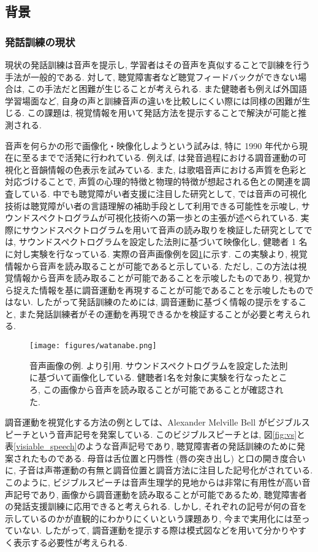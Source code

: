 \subsection{背景}
\subsubsection{発話訓練の現状}
現状の発話訓練は音声を提示し, 学習者はその音声を真似することで訓練を行う手法が一般的である. 対して, 聴覚障害者など聴覚フィードバックができない場合は, この手法だと困難が生じることが考えられる. また健聴者も例えば外国語学習場面など, 自身の声と訓練音声の違いを比較しにくい際には同様の困難が生じる.
この課題は, 視覚情報を用いて発話方法を提示することで解決が可能と推測される.

音声を何らかの形で画像化・映像化しようという試みは, 特に 1990 年代から現在に至るまでで活発に行われている. 例えば, \cite{sirai_kobayashi}は発音過程における調音運動の可視化と音韻情報の色表示を試みている. また, \cite{kanato_kikuchi}は歌唱音声における声質を色彩と対応づけることで, 声質の心理的特徴と物理的特徴が想起される色との関連を調査している.
中でも聴覚障がい者支援に注目した研究として, \cite{kasuya}では音声の可視化技術は聴覚障がい者の言語理解の補助手段として利用できる可能性を示唆し, サウンドスペクトログラムが可視化技術への第一歩との主張が述べられている.
実際にサウンドスペクトログラムを用いて音声の読み取りを検証した研究として\cite{watanabe}では, サウンドスペクトログラムを設定した法則に基づいて映像化し, 健聴者 1 名に対し実験を行なっている. 実際の音声画像例を図\ref{watanabe:fig}に示す. この実験より, 視覚情報から音声を読み取ることが可能であると示している. ただし, この方法は視覚情報から音声を読み取ることが可能であることを示唆したものであり, 視覚から捉えた情報を基に調音運動を再現することが可能であることを示唆したものではない.
したがって発話訓練のためには, 調音運動に基づく情報の提示をすること, また発話訓練者がその運動を再現できるかを検証することが必要と考えられる.

\begin{figure}[hbtp]
 \centering
   \texttt{[image: figures/watanabe.png]}
 \caption[音声画像の例]{音声画像の例. \cite{watanabe}より引用. サウンドスペクトログラムを設定した法則に基づいて画像化している. 健聴者1名を対象に実験を行なったところ, この画像から音声を読み取ることが可能であることが確認された. }
 \label{watanabe:fig}
\end{figure}

\newpage
調音運動を視覚化する方法の例としては、Alexander Melville Bell がビジブルスピーチという音声記号を発案している\cite{igarashi}. このビジブルスピーチとは, 図\ref{fig:vs}と表\ref{visiable_speech}のような音声記号であり, 聴覚障害者の発話訓練のために発案されたものである\cite{hattori}. 母音は舌位置と円唇性 (唇の突き出し) と口の開き度合いに, 子音は声帯運動の有無と調音位置と調音方法に注目した記号化がされている.
このように, ビジブルスピーチは音声生理学的見地からは非常に有用性が高い音声記号であり, 画像から調音運動を読み取ることが可能であるため, 聴覚障害者の発話支援訓練に応用できると考えられる. しかし, それぞれの記号が何の音を示しているのかが直観的にわかりにくいという課題あり, 今まで実用化には至っていない. したがって, 調音運動を提示する際は模式図などを用いて分かりやすく表示する必要性が考えられる.


